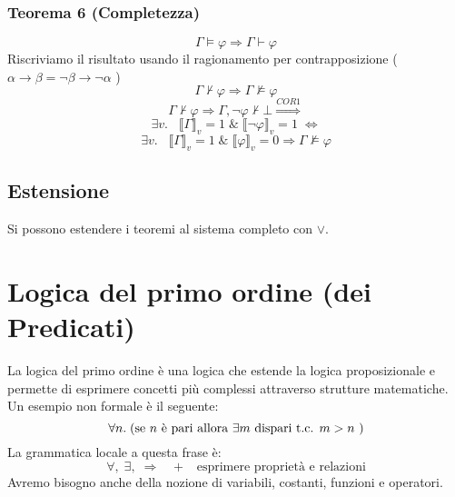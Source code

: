 \documentclass{article}
\theoremstyle{break}
\theoremstyle{break}
\theoremstyle{break}
\theoremstyle{break}
\begin{document}
\subsubsection{Teorema 6 (Completezza)}
\[
  \Gamma \models \varphi \Rightarrow \Gamma \vdash \varphi
\] 
Riscriviamo il risultato usando il ragionamento per contrapposizione (\( \alpha \to \beta = \neg \beta \to \neg \alpha \) )
\[
  \Gamma \not\vdash \varphi \Rightarrow \Gamma \not\models \varphi
\] 
\[
  \Gamma \not\vdash \varphi \Rightarrow \Gamma,\neg \varphi \not\vdash \bot \stackrel{COR1}{\Rightarrow}
\] 
\[
  \exists v.\;\;\; \llbracket \Gamma\rrbracket_v=1 \;\&\; \llbracket \neg \varphi\rrbracket_v=1 \; \Leftrightarrow
\] 
\[
  \exists v.\;\;\; \llbracket \Gamma\rrbracket_v=1\; \&\; \llbracket \varphi\rrbracket_v=0 \Rightarrow \Gamma \not\models \varphi
\] 

\subsection{Estensione}
Si possono estendere i teoremi al sistema completo con \( \vee \).

\section{Logica del primo ordine (dei Predicati)}
La logica del primo ordine è una logica che estende la logica proposizionale 
e permette di esprimere concetti più complessi attraverso strutture matematiche.
Un esempio non formale è il seguente:
\[
  \forall n.\; (\text{se \( n \) è pari allora \( \exists m \) dispari t.c. \( m>n \)  })
\] 
La grammatica locale a questa frase è:
\[
  \forall,\; \exists,\; \Rightarrow\;\;\;+\;\;\;\text{esprimere proprietà e relazioni}
\] 
Avremo bisogno anche della nozione di variabili, costanti, funzioni e operatori.
\end{document}
